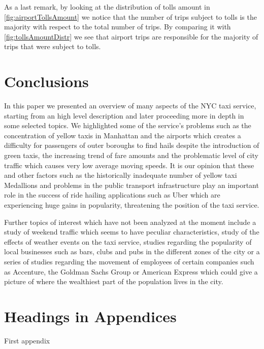 \documentclass{acm_proc_article-sp-sigmod09}
\begin{document}
As a last remark, by looking at the distribution of tolls amount in \cref{fig:airportTollsAmount} we notice that the number of trips subject to tolls is the majority with respect to the total number of trips. By comparing it with \cref{fig:tollsAmountDistr} we see that airport trips are responsible for the majority of trips that were subject to tolls.

\section{Conclusions}

In this paper we presented an overview of many aspects of the NYC taxi service, starting from an high level description and later proceeding more in depth in some selected topics. We highlighted some of the service's problems such as the concentration of yellow taxis in Manhattan and the airports which creates a difficulty for passengers of outer boroughs to find hails despite the introduction of green taxis, the increasing trend of fare amounts and the problematic level of city traffic which causes very low average moving speeds. It is our opinion that these and other factors such as the historically inadequate number of yellow taxi Medallions and problems in the public transport infrastructure play an important role in the success of ride hailing applications such as Uber which are experiencing huge gains in popularity, threatening the position of the taxi service.

Further topics of interest which have not been analyzed at the moment include a study of weekend traffic which seems to have peculiar characteristics, study of the effects of weather events on the taxi service, studies regarding the popularity of local businesses such as bars, clubs and pubs in the different zones of the city or a series of studies regarding the movement of employees of certain companies such as Accenture, the Goldman Sachs Group or American Express which could give a picture of where the wealthiest part of the population lives in the city.

%




\balancecolumns
\appendix
\section{Headings in Appendices}
First appendix
\end{document}
